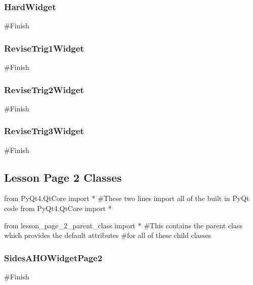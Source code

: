 \begin{landscape}
\subsubsection{HardWidget}

\begin{python}
#Finish
\end{python}

\subsubsection{ReviseTrig1Widget}

\begin{python}
#Finish
\end{python}

\subsubsection{ReviseTrig2Widget}

\begin{python}
#Finish
\end{python}

\subsubsection{ReviseTrig3Widget}

\begin{python}
#Finish
\end{python}

\subsection{Lesson Page 2 Classes}

\begin{python}
from PyQt4.QtCore import * #These two lines import all of the built in PyQt code
from PyQt4.QtCore import *

from lesson_page_2_parent_class import * #This contains the parent class which provides the default attributes
                                         #for all of these child classes
\end{python}

\subsubsection{SidesAHOWidgetPage2}

\begin{python}
#Finish
\end{python}


\end{landscape}
